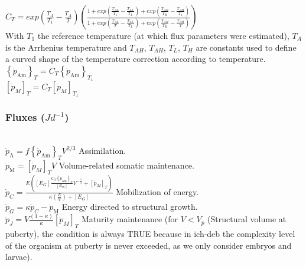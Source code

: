 $
	C_{T} = exp\left ( \frac{T_{A}}{T_{1}} - \frac{T_{A}}{T} \right )
	\left ( \frac
				{1+exp\left ( \frac{T_{AL}}{T_{1}} - \frac{T_{AL}}{T_{L}} \right )
				  +exp\left ( \frac{T_{AH}}{T_{H}} - \frac{T_{AH}}{T_{1}} \right )}
				{1+exp\left ( \frac{T_{AL}}{T} - \frac{T_{AL}}{T_{L}} \right )
				  +exp\left ( \frac{T_{AH}}{T_{H}} - \frac{T_{AH}}{T} \right )}
	\right )
$\\

With $T_{1}$ the reference temperature (at which flux parameters were estimated), $T_{A}$ is the Arrhenius temperature and $T_{AH}$, $T_{AH}$, $T_{L}$, $T_{H}$ are constants used to define a curved shape of the temperature correction according to temperature.\\

$\left \{ \dot{p}_\mathrm{Am} \right \}_{T} = C_{T} \left \{ \dot{p}_\mathrm{Am} \right \}_{T_{1}}$\\

$\left [ \dot{p}_{M} \right ]_{T} = C_{T} \left [ \dot{p}_{M} \right ]_{T_{1}}$\\

\subsubsection{Fluxes ($Jd^{-1}$)}\label{Chap3Fluxex}
\hfill \\

$\dot{p}_\mathrm{A} = f \left \{ \dot{p}_\mathrm{Am} \right \}_{T} V^{2/3}$ \hfill Assimilation.\\

$\dot{p}_\mathrm{M} = \left [ \dot{p}_{M} \right ]_{T} V$ \hfill Volume-related somatic maintenance.\\


	$\dot{p}_{C} = \frac
					   {E\left ( \left [ E_{G} \right ] \frac{C_{T}\left \{ \dot{p}_\mathrm{Am} \right \}_{T}}{\left [ E_{m} \right ]} V^{-\frac{1}{3}}+\left [ \dot{p}_{M} \right ]_{T}\right )}
					   {\kappa\left ( \frac{E}{V} \right ) + \left [ E_{G} \right ]}$ \hfill Mobilization of energy.\\

$\dot{p}_{G} = \kappa \dot{p}_{C} - \dot{p}_\mathrm{M}$ \hfill Energy directed to structural growth.\\

$\dot{p}_{J} = V \frac{\left ( 1 - \kappa \right )}{\kappa}\left [ \dot{p}_{M} \right ]_{T}$ \hfill Maturity maintenance (for $V < V_{p}$ (Structural volume at puberty), the condition is always TRUE because in \gls{ich-deb} the complexity level of the organism at puberty is never exceeded, as we only consider embryos and larvae).\\

